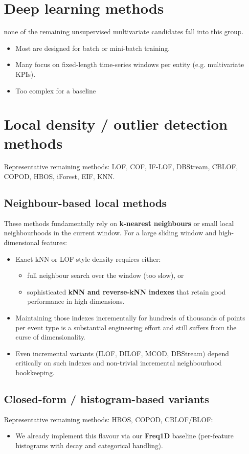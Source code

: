 \documentclass[a4paper,11pt]{article}
\begin{document}
\section{Deep learning methods}
none of the remaining unsupervised multivariate candidates fall into this group.
\begin{itemize}
  \item Most are designed for batch or mini-batch training.
  \item Many focus on fixed-length time-series windows per entity (e.g. multivariate KPIs).
  \item Too complex for a baseline
\end{itemize}

\section{Local density / outlier detection methods}
Representative remaining methods: LOF, COF, IF-LOF, DBStream, CBLOF, COPOD, HBOS, iForest, EIF, KNN.

\subsection*{Neighbour-based local methods}
These methods fundamentally rely on \textbf{k-nearest neighbours} or small local neighbourhoods in the current window. For a large sliding window and high-dimensional features:
\begin{itemize}
  \item Exact kNN or LOF-style density requires either:
  \begin{itemize}
    \item full neighbour search over the window (too slow), or
    \item sophisticated \textbf{kNN and reverse-kNN indexes} that retain good performance in high dimensions.
  \end{itemize}
  \item Maintaining those indexes incrementally for hundreds of thousands of points per event type is a substantial engineering effort and still suffers from the curse of dimensionality.
  \item Even incremental variants (ILOF, DILOF, MCOD, DBStream) depend critically on such indexes and non-trivial incremental neighbourhood bookkeeping.
\end{itemize}

\subsection*{Closed-form / histogram-based variants}
Representative remaining methods: HBOS, COPOD, CBLOF/BLOF:
\begin{itemize}
  \item We already implement this flavour via our \textbf{Freq1D} baseline (per-feature histograms with decay and categorical handling).
\end{itemize}
\end{document}
